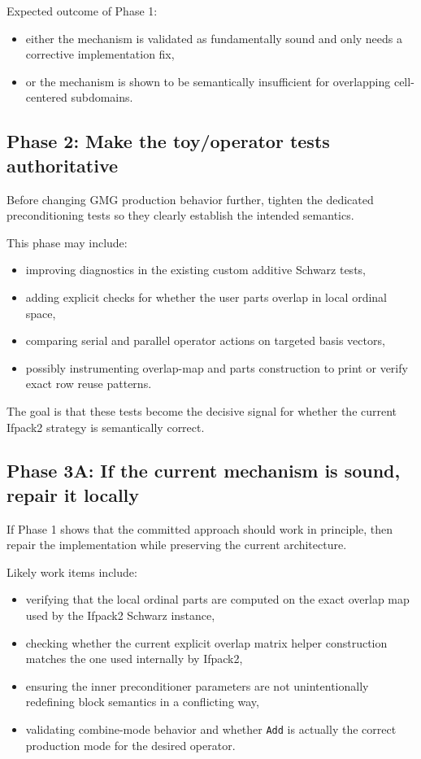\documentclass[11pt]{article}
\begin{document}
Expected outcome of Phase 1:
\begin{itemize}
  \item either the mechanism is validated as fundamentally sound and only needs a corrective implementation fix,
  \item or the mechanism is shown to be semantically insufficient for overlapping cell-centered subdomains.
\end{itemize}

\subsection{Phase 2: Make the toy/operator tests authoritative}
Before changing GMG production behavior further, tighten the dedicated preconditioning tests so they clearly establish the intended semantics.

This phase may include:
\begin{itemize}
  \item improving diagnostics in the existing custom additive Schwarz tests,
  \item adding explicit checks for whether the user parts overlap in local ordinal space,
  \item comparing serial and parallel operator actions on targeted basis vectors,
  \item possibly instrumenting overlap-map and parts construction to print or verify exact row reuse patterns.
\end{itemize}

The goal is that these tests become the decisive signal for whether the current Ifpack2 strategy is semantically correct.

\subsection{Phase 3A: If the current mechanism is sound, repair it locally}
If Phase 1 shows that the committed approach should work in principle, then repair the implementation while preserving the current architecture.

Likely work items include:
\begin{itemize}
  \item verifying that the local ordinal parts are computed on the exact overlap map used by the Ifpack2 Schwarz instance,
  \item checking whether the current explicit overlap matrix helper construction matches the one used internally by Ifpack2,
  \item ensuring the inner preconditioner parameters are not unintentionally redefining block semantics in a conflicting way,
  \item validating combine-mode behavior and whether \texttt{Add} is actually the correct production mode for the desired operator.
\end{itemize}
\end{document}
